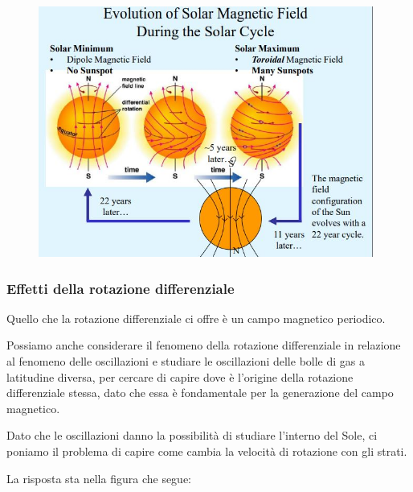 
\begin{figure}[H]
    \centering
    \includegraphics[width=11cm]{2dic/RotazioneDifferenziale.jpg}
    \label{fig:CampiMageRotazDiff}
\end{figure}

\subsubsection{Effetti della rotazione differenziale}

Quello che la rotazione differenziale ci offre è un campo magnetico periodico.

Possiamo anche considerare il fenomeno della rotazione differenziale in relazione al fenomeno delle oscillazioni e studiare le oscillazioni delle bolle di gas a latitudine diversa, per cercare di capire dove è l'origine della rotazione differenziale stessa, dato che essa è fondamentale per la generazione del campo magnetico.

Dato che le oscillazioni danno la possibilità di studiare l'interno del Sole, ci poniamo il problema di capire come cambia la velocità di rotazione con gli strati.

La risposta sta nella figura che segue:

